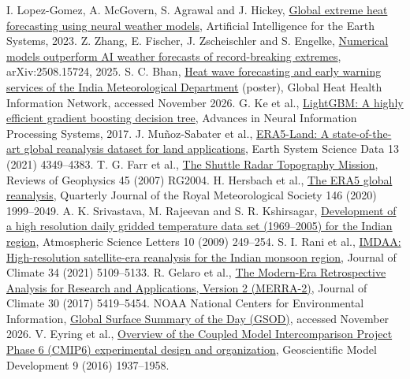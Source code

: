 \documentclass[12pt,a4paper]{report}
\newcommand{\reflink}[2]{\href{#1}{\textcolor{linkblue}{#2}}}
\begin{document}
{\begin{thebibliography}{99}
 I. Lopez-Gomez, A. McGovern, S. Agrawal and J. Hickey, \reflink{https://arxiv.org/abs/2205.10972}{Global extreme heat forecasting using neural weather models}, Artificial Intelligence for the Earth Systems, 2023.
 Z. Zhang, E. Fischer, J. Zscheischler and S. Engelke, \reflink{https://arxiv.org/abs/2508.15724}{Numerical models outperform AI weather forecasts of record-breaking extremes}, arXiv:2508.15724, 2025.
 S. C. Bhan, \reflink{https://heathealth.info/wp-content/uploads/Poster_SC-Bhan_FGFHH-Subhash-Bhan.pdf}{Heat wave forecasting and early warning services of the India Meteorological Department} (poster), Global Heat Health Information Network, accessed November 2026.
 G. Ke et al., \reflink{https://papers.nips.cc/paper/6907-lightgbm-a-highly-efficient-gradient-boosting-decision-tree}{LightGBM: A highly efficient gradient boosting decision tree}, Advances in Neural Information Processing Systems, 2017.
 J. Mu\~noz-Sabater et al., \reflink{https://doi.org/10.5194/essd-13-4349-2021}{ERA5-Land: A state-of-the-art global reanalysis dataset for land applications}, Earth System Science Data 13 (2021) 4349--4383.
 T. G. Farr et al., \reflink{https://doi.org/10.1029/2005RG000183}{The Shuttle Radar Topography Mission}, Reviews of Geophysics 45 (2007) RG2004.
 H. Hersbach et al., \reflink{https://doi.org/10.1002/qj.3803}{The ERA5 global reanalysis}, Quarterly Journal of the Royal Meteorological Society 146 (2020) 1999--2049.
 A. K. Srivastava, M. Rajeevan and S. R. Kshirsagar, \reflink{https://doi.org/10.1002/asl.232}{Development of a high resolution daily gridded temperature data set (1969--2005) for the Indian region}, Atmospheric Science Letters 10 (2009) 249--254.
 S. I. Rani et al., \reflink{https://doi.org/10.1175/JCLI-D-20-0412.1}{IMDAA: High-resolution satellite-era reanalysis for the Indian monsoon region}, Journal of Climate 34 (2021) 5109--5133.
 R. Gelaro et al., \reflink{https://doi.org/10.1175/JCLI-D-16-0758.1}{The Modern-Era Retrospective Analysis for Research and Applications, Version 2 (MERRA-2)}, Journal of Climate 30 (2017) 5419--5454.
 NOAA National Centers for Environmental Information, \reflink{https://www.ncei.noaa.gov/access/metadata/landing-page/bin/iso?id=gov.noaa.ncdc:C00516}{Global Surface Summary of the Day (GSOD)}, accessed November 2026.
 V. Eyring et al., \reflink{https://doi.org/10.5194/gmd-9-1937-2016}{Overview of the Coupled Model Intercomparison Project Phase 6 (CMIP6) experimental design and organization}, Geoscientific Model Development 9 (2016) 1937--1958.

\end{thebibliography}}
\end{document}

